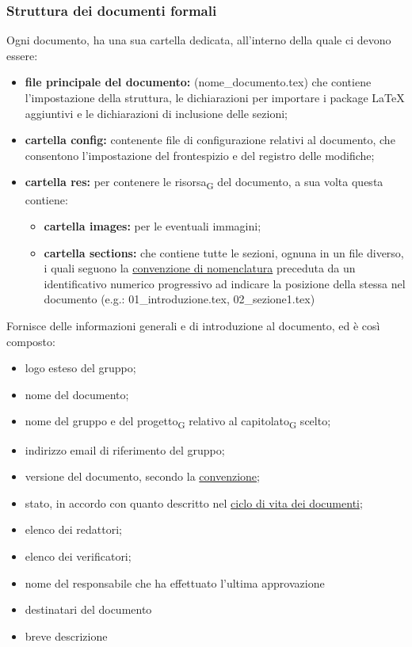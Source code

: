     \subsubsection{Struttura dei documenti formali}
    Ogni documento, ha una sua cartella dedicata, all'interno della quale ci devono essere:
    \begin{itemize}
        \item \textbf{file principale del documento: }(nome\_documento.tex) che contiene l'impostazione della struttura, le dichiarazioni per importare i package \LaTeX{} aggiuntivi e le dichiarazioni di inclusione delle sezioni;
        \item \textbf{cartella config: }contenente file di configurazione relativi al documento, che consentono l'impostazione del frontespizio e del registro delle modifiche;
        \item \textbf{cartella res: }per contenere le risorsa\textsubscript{G} del documento, a sua volta questa contiene:
        \begin{itemize}
            \item \textbf{cartella images: }per le eventuali immagini;
            \item \textbf{cartella sections: }che contiene tutte le sezioni, ognuna in un file diverso, i quali seguono la \hyperref[convezionenomifile]{convenzione di nomenclatura} preceduta da un identificativo numerico progressivo ad indicare la posizione della stessa nel documento (e.g.: 01\_introduzione.tex, 02\_sezione1.tex)
        \end{itemize}
    \end{itemize}
    Fornisce delle informazioni generali e di introduzione al documento, ed è così composto:
    \begin{itemize}
        \item logo esteso del gruppo;
        \item nome del documento;
        \item nome del gruppo e del progetto\textsubscript{G} relativo al capitolato\textsubscript{G} scelto;
        \item indirizzo email di riferimento del gruppo;
        \item versione del documento, secondo la \hyperref[versions]{convenzione};
        \item stato, in accordo con quanto descritto nel \hyperref[ciclovitadoc]{ciclo di vita dei documenti};
        \item elenco dei redattori;
        \item elenco dei verificatori;
        \item nome del responsabile che ha effettuato l'ultima approvazione
        \item destinatari del documento
        \item breve descrizione
    \end{itemize}
